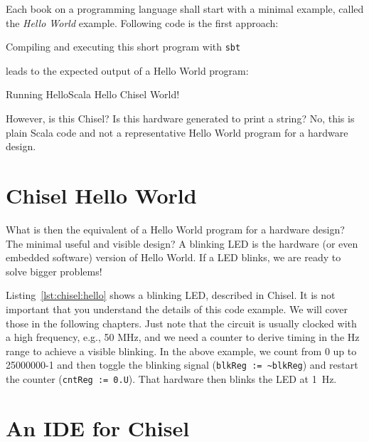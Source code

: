 \documentclass[%
    10pt,
    headinclude, footexclude,
    openright, %
    notitlepage,
    cleardoubleempty,
    headsepline,
    pointlessnumbers,
    bibtotoc, idxtotoc,
    ]{scrbook}
\newcommand{\code}[1]{{\small{\texttt{#1}}}}
\begin{document}
Each book on a programming language shall start with a minimal example,
called the \emph{Hello World} example. Following code is the first approach:




\noindent Compiling and executing this short program with \code{sbt}


\noindent leads to the expected output of a Hello World program:

\begin{chisel}
[info] Running HelloScala
Hello Chisel World!
\end{chisel}

\noindent However, is this Chisel? Is this hardware generated to print a string?
No, this is plain Scala code and not a representative Hello World
program for a hardware design.

\section{Chisel Hello World}

What is then the equivalent of a Hello World program for a hardware design?
The minimal useful and visible design? A blinking LED is the hardware (or even
embedded software) version of Hello World. If a LED blinks, we are ready to
solve bigger problems!


Listing~\ref{lst:chisel:hello} shows a blinking LED, described in Chisel.
It is not important that you understand the details of this code example.
We will cover those in the following chapters. Just note that the circuit is
usually clocked with a high frequency, e.g., 50 MHz, and we need a counter
to derive timing in the Hz range to achieve a visible blinking. In the above
example, we count from 0 up to 25000000-1 and then toggle the blinking signal
(\code{blkReg := \textasciitilde blkReg}) and restart the counter (\code{cntReg := 0.U}).
That hardware then blinks the LED at 1~Hz.

\section{An IDE for Chisel}
\end{document}
